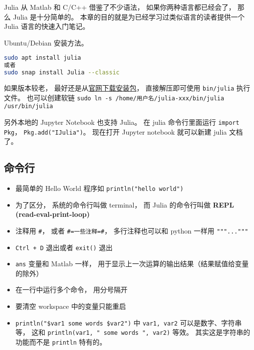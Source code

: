 
\begin{issues}
\issueDraft
\end{issues}

Julia 从 Matlab 和 C/C++ 借鉴了不少语法， 如果你两种语言都已经会了， 那么 Julia 是十分简单的。 本章的目的就是为已经学习过类似语言的读者提供一个 Julia 语言的快速入门笔记。

Ubuntu/Debian 安装方法。
\begin{lstlisting}[language=bash]
sudo apt install julia
或者
sudo snap install Julia --classic
\end{lstlisting}
如果版本较老， 最好还是从\href{https://julialang.org/downloads}{官网下载安装包}， 直接解压即可使用 \verb|bin/julia| 执行文件。 也可以创建软链 \verb|sudo ln -s /home/用户名/julia-xxx/bin/julia /usr/bin/julia|

另外本地的 Jupyter Notebook 也支持 Julia。 在 julia 命令行里面运行 \verb|import Pkg|， \verb|Pkg.add("IJulia")|。 现在打开 Jupyter notebook 就可以新建 julia 文档了。

\subsection{命令行}
\begin{itemize}
\item 最简单的 Hello World 程序如 \verb|println("hello world")|

\item 为了区分， 系统的命令行叫做 terminal， 而 Julia 的命令行叫做 \textbf{REPL (read-eval-print-loop)}
\item 注释用 \verb|#|， 或者 \verb|#=一些注释=#|， 多行注释也可以和 python 一样用 \verb|"""..."""|
\item \verb|Ctrl + D| 退出或者 \verb|exit()| 退出
\item \verb|ans| 变量和 Matlab 一样， 用于显示上一次运算的输出结果（结果赋值给变量的除外）
\item 在一行中运行多个命令， 用分号隔开
\item 要清空 workspace 中的变量只能重启
\item \verb|println("$var1 some words $var2")| 中 \verb|var1, var2| 可以是数字、字符串等， 这和 \verb|println(var1, " some words ", var2)| 等效。 其实这是字符串的功能而不是 \verb|println| 特有的。
\end{itemize}

